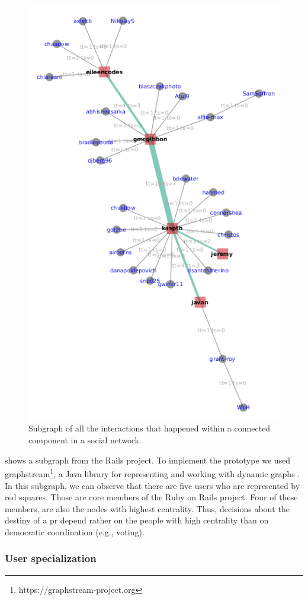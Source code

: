 \begin{figure}[h]
	\centering
	\includegraphics[width=0.7\linewidth]{figures/socio-graph}
	\caption[Subgraph of all the interactions in a group]{Subgraph of all the interactions that happened within a connected component in a social network.}
	\label{fig:socio-graph}
\end{figure}

 shows a subgraph from the Rails project. To implement the prototype we used graphstream\footnote{https://graphstream-project.org}, a Java library for representing and working with dynamic graphs \citep{DBLP:journals/corr/abs-0803-2093}. In this subgraph, we can observe that there are five users who are represented by red squares. Those are core members of the Ruby on Rails project. Four of these members, are also the nodes with highest centrality. Thus, decisions about the destiny of a \gls{pr} depend rather on the people with high centrality \citep{singh2020centrality,DBLP:journals/snam/Doostmohammadian20} than on democratic coordination (e.g., voting). 

\subsubsection{User specialization}

